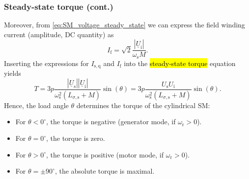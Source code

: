 \begin{frame}
	\frametitle{Steady-state torque (cont.)} 
	\onslide<+->
	Moreover, from \eqref{eq:SM_voltage_steady_state} we can express the field winding current (amplitude, DC quantity) as
	\begin{equation}
		I_\mathrm{f} = \sqrt{2}\frac{\left|\underline{U}_\mathrm{i}\right|}{\omega_\mathrm{s}M}.
	\end{equation}
	\onslide<+->
	Inserting the expressions for $I_\mathrm{s,q}$ and $I_\mathrm{f}$ into the \hl{steady-state torque} equation yields
	\begin{equation}
		T = 3 p \frac{\left|\underline{U}_\mathrm{s}\right| \left|\underline{U}_\mathrm{i}\right|}{\omega_\mathrm{s}^2 \left(L_{\sigma,\mathrm{s}} + M\right)}  \sin(\theta)  = 3 p \frac{U_\mathrm{s} U_\mathrm{i}}{\omega_\mathrm{s}^2 \left(L_{\sigma,\mathrm{s}} + M\right)}  \sin(\theta). 
		\label{eq:SM_torque_steady_state}
	\end{equation}
	\onslide<+->
	Hence, the load angle $\theta$ determines the torque of the cylindrical SM:
	\begin{itemize}
		\item<+-> For $\theta < 0^\circ$, the torque is negative (generator mode, if $\omega_\mathrm{r}>0$).
		\item<+-> For $\theta = 0^\circ$, the torque is zero.
		\item<+-> For $\theta > 0^\circ$, the torque is positive (motor mode, if $\omega_\mathrm{r}>0$).
		\item<+-> For $\theta = \pm 90^\circ$, the absolute torque is maximal.
	\end{itemize}
\end{frame}

